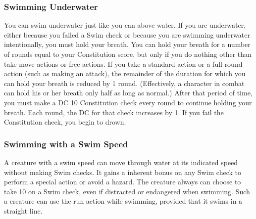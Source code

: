 \subsubsection{Swimming Underwater}
You can swim underwater just like you can above water. If you are underwater, either because you failed a Swim check or because you are swimming underwater intentionally, you must hold your breath. You can hold your breath for a number of rounds equal to your Constitution score, but only if you do nothing other than take move actions or free actions. If you take a standard action or a full-round action (such as making an attack), the remainder of the duration for which you can hold your breath is reduced by 1 round. (Effectively, a character in combat can hold his or her breath only half as long as normal.) After that period of time, you must make a DC 10 Constitution check every round to continue holding your breath. Each round, the DC for that check increases by 1. If you fail the Constitution check, you begin to drown.

\subsubsection{Swimming with a Swim Speed}
A creature with a swim speed can move through water at its indicated speed without making Swim checks. It gains a  inherent bonus on any Swim check to perform a special action or avoid a hazard. The creature always can choose to take 10 on a Swim check, even if distracted or endangered when swimming. Such a creature can use the run action while swimming, provided that it swims in a straight line.
